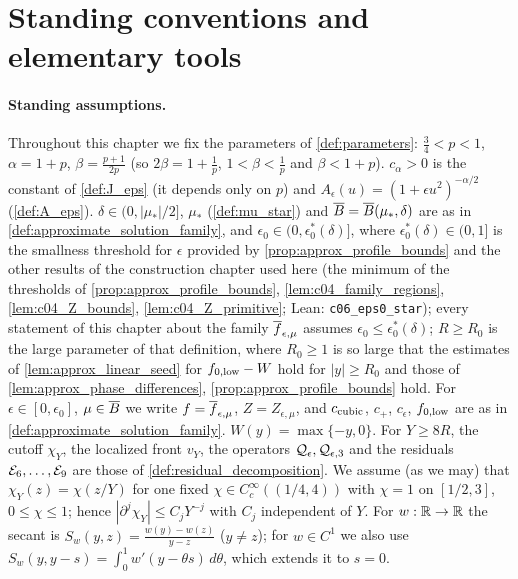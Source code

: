 
\section{Standing conventions and elementary tools}

\paragraph{Standing assumptions.}
Throughout this chapter we fix the parameters of \cref{def:parameters}: $\tfrac34<p<1$,
$\alpha=1+p$, $\beta=\tfrac{p+1}{2p}$ (so $2\beta=1+\tfrac1p$, $1<\beta<\tfrac1p$ and
$\beta<1+p$). $c_\alpha>0$ is the constant of \cref{def:J_eps} (it depends only on $p$) and
$A_\epsilon(u)=(1+\epsilon u^2)^{-\alpha/2}$ (\cref{def:A_eps}).
$\delta\in(0,|\mu_*|/2]$, $\mu_*$ (\cref{def:mu_star}) and
$\overline{B}=\overline{B}(\mu_*,\delta)$ are as in \cref{def:approximate_solution_family}, and
$\epsilon_0\in(0,\epsilon_0^*(\delta)]$, where $\epsilon_0^*(\delta)\in(0,1]$ is the smallness threshold
for $\epsilon$ provided by \cref{prop:approx_profile_bounds} and the other results of the construction chapter
used here (the minimum of the thresholds of \cref{prop:approx_profile_bounds}, \cref{lem:c04_family_regions},
\cref{lem:c04_Z_bounds}, \cref{lem:c04_Z_primitive}; Lean: \texttt{c06\_eps0\_star}); every
statement of this chapter about the family $\overline{f}_{\epsilon,\mu}$ assumes $\epsilon_0\le\epsilon_0^*(\delta)$; $R\geq R_0$ is the
large parameter of that definition, where $R_0\geq1$ is so large that the estimates of
\cref{lem:approx_linear_seed} for $f_{0,\textup{low}}-W$ hold for $|y|\geq R_0$ and those of
\cref{lem:approx_phase_differences}, \cref{prop:approx_profile_bounds} hold.
For $\epsilon\in[0,\epsilon_0]$, $\mu\in\overline{B}$ we write $f=\overline{f}_{\epsilon,\mu}$, $Z=Z_{\epsilon,\mu}$,
and $c_{\textup{cubic}}$, $c_+$, $c_\epsilon$, $f_{0,\textup{low}}$ are as in
\cref{def:approximate_solution_family}. $W(y)=\max\{-y,0\}$.
For $Y\geq 8R$, the cutoff $\chi_Y$, the localized front $v_Y$, the operators
$\mathcal{Q}_\epsilon,\mathcal{Q}_{\epsilon,3}$ and the residuals $\mathcal{E}_6,\dots,\mathcal{E}_9$ are those of
\cref{def:residual_decomposition}. We assume (as we may) that $\chi_Y(z)=\chi(z/Y)$ for one fixed
$\chi\in C^\infty_c((1/4,4))$ with $\chi=1$ on $[1/2,3]$, $0\le\chi\le1$; hence
$|\partial^j\chi_Y|\le C_jY^{-j}$ with $C_j$ independent of $Y$.
For $w:\mathbb{R}\to\mathbb{R}$ the secant is $S_w(y,z)=\frac{w(y)-w(z)}{y-z}$ ($y\neq z$); for $w\in C^1$ we also use
$S_w(y,y-s)=\int_0^1 w'(y-\theta s)\,d\theta$, which extends it to $s=0$.

